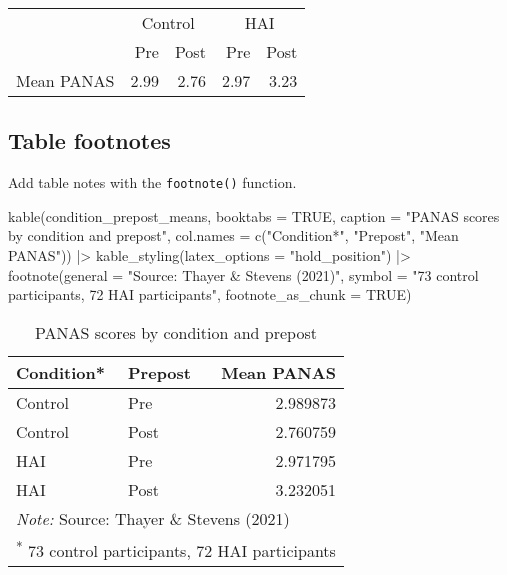 \documentclass[
  doc]{apa6}
\newenvironment{Shaded}{\begin{snugshade}}{\end{snugshade}}
\newcommand{\AttributeTok}[1]{\textcolor[rgb]{0.77,0.63,0.00}{#1}}
\newcommand{\ConstantTok}[1]{\textcolor[rgb]{0.00,0.00,0.00}{#1}}
\newcommand{\FunctionTok}[1]{\textcolor[rgb]{0.00,0.00,0.00}{#1}}
\newcommand{\NormalTok}[1]{#1}
\newcommand{\SpecialCharTok}[1]{\textcolor[rgb]{0.00,0.00,0.00}{#1}}
\newcommand{\StringTok}[1]{\textcolor[rgb]{0.31,0.60,0.02}{#1}}
\begin{document}
\begin{tabular}{lrrrr}
\toprule
\multicolumn{1}{c}{} & \multicolumn{2}{c}{Control} & \multicolumn{2}{c}{HAI} \\
\cmidrule(l{3pt}r{3pt}){2-3} \cmidrule(l{3pt}r{3pt}){4-5}
 & Pre & Post & Pre & Post\\
\midrule
Mean PANAS & 2.99 & 2.76 & 2.97 & 3.23\\
\bottomrule
\end{tabular}

\newpage

\hypertarget{table-footnotes}{%
\subsection{Table footnotes}\label{table-footnotes}}

Add table notes with the \texttt{footnote()} function.

\begin{Shaded}
\begin{Highlighting}[]
\FunctionTok{kable}\NormalTok{(condition\_prepost\_means, }
      \AttributeTok{booktabs =} \ConstantTok{TRUE}\NormalTok{,}
      \AttributeTok{caption =} \StringTok{"PANAS scores by condition and prepost"}\NormalTok{,}
      \AttributeTok{col.names =} \FunctionTok{c}\NormalTok{(}\StringTok{"Condition*"}\NormalTok{, }\StringTok{"Prepost"}\NormalTok{, }\StringTok{"Mean PANAS"}\NormalTok{)) }\SpecialCharTok{|\textgreater{}}
  \FunctionTok{kable\_styling}\NormalTok{(}\AttributeTok{latex\_options =} \StringTok{"hold\_position"}\NormalTok{) }\SpecialCharTok{|\textgreater{}}
  \FunctionTok{footnote}\NormalTok{(}\AttributeTok{general =} \StringTok{"Source: Thayer \& Stevens (2021)"}\NormalTok{,}
           \AttributeTok{symbol =} \StringTok{"73 control participants, 72 HAI participants"}\NormalTok{,}
           \AttributeTok{footnote\_as\_chunk =} \ConstantTok{TRUE}\NormalTok{)}
\end{Highlighting}
\end{Shaded}

\begin{table}[!h]

\caption{\label{tab:unnamed-chunk-17}PANAS scores by condition and prepost}
\centering
\begin{tabular}[t]{llr}
\toprule
Condition* & Prepost & Mean PANAS\\
\midrule
Control & Pre & 2.989873\\
Control & Post & 2.760759\\
HAI & Pre & 2.971795\\
HAI & Post & 3.232051\\
\bottomrule
\multicolumn{3}{l}{\rule{0pt}{1em}\textit{Note: } Source: Thayer \& Stevens (2021)}\\
\multicolumn{3}{l}{\rule{0pt}{1em}\textsuperscript{*} 73 control participants, 72 HAI participants}\\
\end{tabular}
\end{table}
\end{document}

